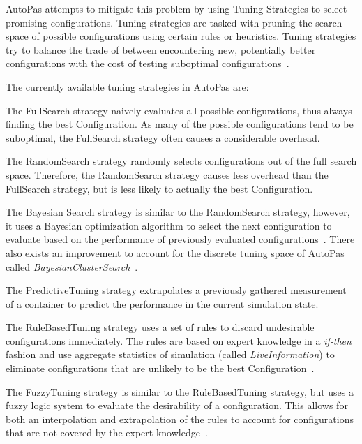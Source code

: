 \documentclass[conference]{IEEEtran}
\begin{document}
AutoPas attempts to mitigate this problem by using Tuning Strategies to select promising configurations. Tuning strategies are tasked with pruning the search space of possible configurations using certain rules or heuristics. Tuning strategies try to balance the trade of between encountering new, potentially better configurations with the cost of testing suboptimal configurations~\cite{Newcome2023Poster}.

The currently available tuning strategies in AutoPas are:

\begin{description}[style=nextline]
    \item[FullSearch]
        The FullSearch strategy naively evaluates all possible configurations, thus always finding the best Configuration. As many of the possible configurations tend to be suboptimal\cite{Manuel_Lerchner_Thesis.pdf}, the FullSearch strategy often causes a considerable overhead.

    \item[RandomSearch]
        The RandomSearch strategy randomly selects configurations out of the full search space. Therefore, the RandomSearch strategy causes less overhead than the FullSearch strategy, but is less likely to actually the best Configuration.

    \item[BayesianSearch]
        The Bayesian Search strategy is similar to the RandomSearch strategy, however, it uses a Bayesian optimization algorithm to select the next configuration to evaluate based on the performance of previously evaluated configurations~\cite{njan_master}. There also exists an improvement to account for the discrete tuning space of AutoPas called \textit{BayesianClusterSearch}~\cite{njan_master}.

    \item[PredictiveTuning]
        The PredictiveTuning strategy extrapolates a previously gathered measurement of a container to predict the performance in the current simulation state.

    \item[RuleBasedTuning]
        The RuleBasedTuning strategy uses a set of rules to discard undesirable configurations immediately. The rules are based on expert knowledge in a \textit{if-then} fashion and use aggregate statistics of simulation (called \textit{LiveInformation}) to eliminate configurations that are unlikely to be the best Configuration~\cite{endreport.pdf}.

    \item[FuzzyTuning]
        The FuzzyTuning strategy is similar to the RuleBasedTuning strategy, but uses a fuzzy logic system to evaluate the desirability of a configuration. This allows for both an interpolation and extrapolation of the rules to account for configurations that are not covered by the expert knowledge~\cite{Manuel_Lerchner_Thesis.pdf}.

\end{description}
\end{document}
